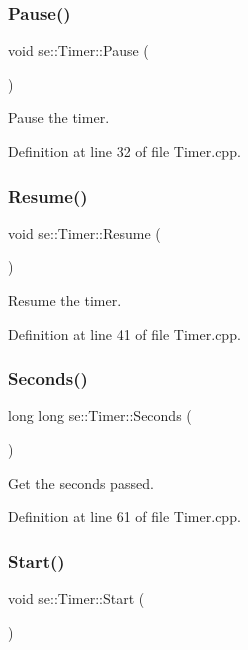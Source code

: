 \subsubsection{\texorpdfstring{Pause()}{Pause()}}
{\footnotesize\ttfamily void se\+::\+Timer\+::\+Pause (\begin{DoxyParamCaption}{ }\end{DoxyParamCaption})}

Pause the timer. 

Definition at line 32 of file Timer.\+cpp.

\mbox{\label{classse_1_1_timer_a432406f463e02336c1033d65ae1d746e}} 
\subsubsection{\texorpdfstring{Resume()}{Resume()}}
{\footnotesize\ttfamily void se\+::\+Timer\+::\+Resume (\begin{DoxyParamCaption}{ }\end{DoxyParamCaption})}

Resume the timer. 

Definition at line 41 of file Timer.\+cpp.

\mbox{\label{classse_1_1_timer_a258761c48271338588503d8170532bde}} 
\subsubsection{\texorpdfstring{Seconds()}{Seconds()}}
{\footnotesize\ttfamily long long se\+::\+Timer\+::\+Seconds (\begin{DoxyParamCaption}{ }\end{DoxyParamCaption})}

Get the seconds passed. 

Definition at line 61 of file Timer.\+cpp.

\mbox{\label{classse_1_1_timer_a0294f5629a28a1e169a8d1b5ab179273}} 
\subsubsection{\texorpdfstring{Start()}{Start()}}
{\footnotesize\ttfamily void se\+::\+Timer\+::\+Start (\begin{DoxyParamCaption}{ }\end{DoxyParamCaption})}

